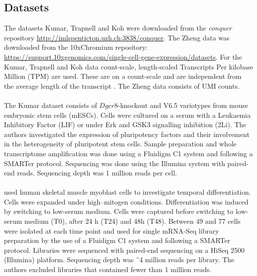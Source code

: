 \documentclass[11pt, a4paper]{article}\usepackage[]{graphicx}\usepackage[]{color}
\begin{document}
\subsection{Datasets}
The datasets Kumar, Trapnell and Koh were downloaded from the \textit{conquer} repository \url{http://imlspenticton.uzh.ch:3838/conquer}. The Zheng data was downloaded from the 10xChromium repository: \url{https://support.10xgenomics.com/single-cell-gene-expression/datasets}. For the Kumar, Trapnell and Koh data count-scale, length-scaled Transcripts Per kilobase Million (TPM) are used.  These are on a count-scale and are independent from the average length of the transcript \citep{soneson2015differential}. The Zheng data consists of UMI counts.
\paragraph{\citet{kumar2014deconstructing}}
The Kumar dataset consists of $Dgcr8$-knockout and V6.5 variotypes from mouse embryonic stem cells (mESCs). Cells were cultured on a serum with a Leukaemia Inhibitory Factor (LIF) or under Erk and GSK3 signalling inhibition (2Li). The authors investigated the expression of pluripotency factors and their involvement in the heterogeneity of pluripotent stem cells. Sample preparation and whole transcriptome amplification was done using a Fluidigm C1 system and following a SMARTer protocol. Sequencing was done using the Illumina system with paired-end reads. Sequencing depth was 1 million reads per cell.
\paragraph{\citet{trapnell2014dynamics}} 
\citet{trapnell2014dynamics} used human skeletal muscle myoblast cells to investigate temporal differentiation. Cells were expanded under high--mitogen conditions. Differentiation was induced by switching to low-serum medium. Cells were captured before switching to low-serum medium (T0), after 24 h (T24) and 48h (T48). Between 49 and 77 cells were isolated at each time point and used for single mRNA-Seq library preparation by the use of a Fluidigm C1 system and following a SMARTer protocol. Libraries were sequenced with paired-end sequencing on a HiSeq 2500 (Illumina) platform. Sequencing depth was ˜4 million reads per library. The authors excluded libraries that contained fewer than 1 million reads. 
\end{document}
